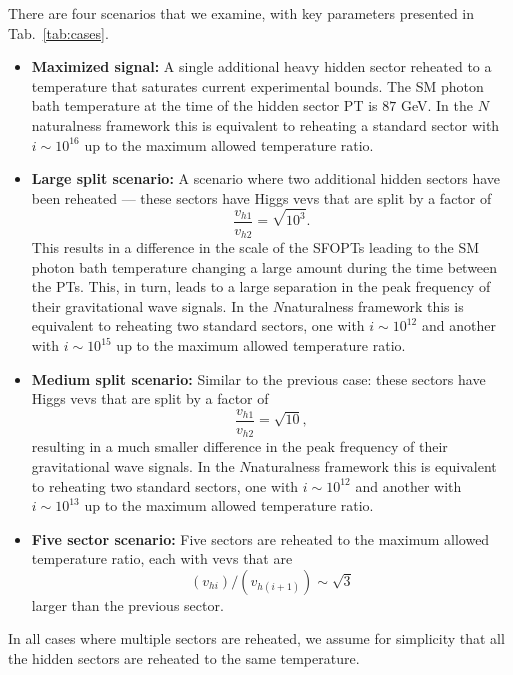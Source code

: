 \documentclass[nofootinbib,twocolumn,preprintnumbers]{revtex4-1}
\begin{document}
There are four scenarios that we examine, with key parameters presented in Tab.~\ref{tab:cases}. 
\begin{itemize}
\item \textbf{Maximized signal:} A single additional heavy hidden sector reheated to a temperature that saturates current experimental bounds. The SM photon bath temperature at the time of the hidden sector PT is $87$ GeV. In the $N$naturalness framework this is equivalent to reheating a standard sector with $i\sim 10^{16}$ up to the maximum allowed temperature ratio.

\item \textbf{Large split scenario:} A scenario where two additional hidden sectors have been reheated --- these sectors have Higgs vevs that are split by a factor of 
\begin{equation}
 \frac{v_{h1}}{v_{h2}} = \sqrt{10^3}.
\end{equation}
This results in a difference in the scale of the SFOPTs leading to the SM photon bath temperature changing a large amount during the time between the PTs. This, in turn, leads to a large separation in the peak frequency of their gravitational wave signals.  In the $N$naturalness framework this is equivalent to reheating two standard sectors, one with $i\sim 10^{12}$ and another with $i\sim 10^{15}$ up to the maximum allowed temperature ratio.

\item \textbf{Medium split scenario:} Similar to the previous case: these sectors have Higgs vevs that are split by a factor of 
 \begin{equation}
 \frac{v_{h1}}{v_{h2}} = \sqrt{10},
\end{equation}
resulting in a much smaller difference in the peak frequency of their gravitational wave signals. In the $N$naturalness framework this is equivalent to reheating two standard sectors, one with $i\sim 10^{12}$ and another with $i\sim 10^{13}$ up to the maximum allowed temperature ratio.

\item \textbf{Five sector scenario:} Five sectors are reheated to the maximum allowed temperature ratio, each with vevs that are 
\begin{equation}
 (v_{hi})/(v_{h(i+1)}) \sim \sqrt{3} 
\end{equation}
 larger than the previous sector.

\end{itemize}
%
In all cases where multiple sectors are reheated, we assume for simplicity that all the hidden sectors are reheated to the same temperature. 
\end{document}
